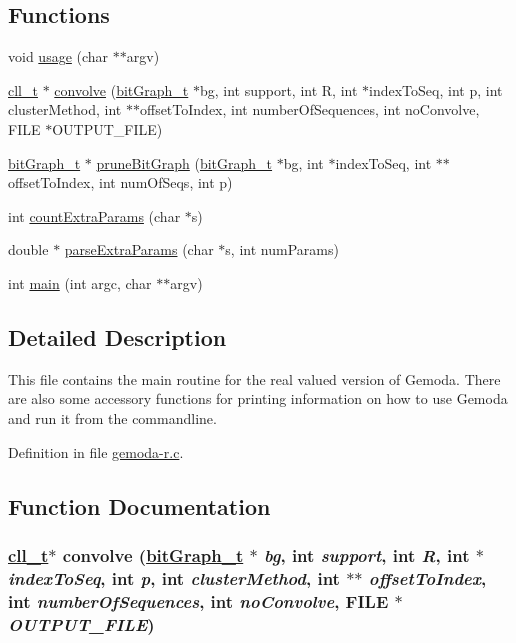 \subsection*{Functions}
\begin{CompactItemize}
\item 
void \hyperlink{gemoda-r_8c_a0}{usage} (char $\ast$$\ast$argv)
\item 
\hyperlink{structcnode}{cll\_\-t} $\ast$ \hyperlink{gemoda-r_8c_a1}{convolve} (\hyperlink{structbitGraph__t}{bit\-Graph\_\-t} $\ast$bg, int support, int R, int $\ast$index\-To\-Seq, int p, int cluster\-Method, int $\ast$$\ast$offset\-To\-Index, int number\-Of\-Sequences, int no\-Convolve, FILE $\ast$OUTPUT\_\-FILE)
\item 
\hyperlink{structbitGraph__t}{bit\-Graph\_\-t} $\ast$ \hyperlink{gemoda-r_8c_a2}{prune\-Bit\-Graph} (\hyperlink{structbitGraph__t}{bit\-Graph\_\-t} $\ast$bg, int $\ast$index\-To\-Seq, int $\ast$$\ast$offset\-To\-Index, int num\-Of\-Seqs, int p)
\item 
int \hyperlink{gemoda-r_8c_a3}{count\-Extra\-Params} (char $\ast$s)
\item 
double $\ast$ \hyperlink{gemoda-r_8c_a4}{parse\-Extra\-Params} (char $\ast$s, int num\-Params)
\item 
int \hyperlink{gemoda-r_8c_a5}{main} (int argc, char $\ast$$\ast$argv)
\end{CompactItemize}


\subsection*{Detailed Description}
This file contains the main routine for the real valued version of Gemoda. There are also some accessory functions for printing information on how to use Gemoda and run it from the commandline.

Definition in file \hyperlink{gemoda-r_8c-source}{gemoda-r.c}.

\subsection*{Function Documentation}
\hypertarget{gemoda-r_8c_a1}{
\subsubsection[convolve]{\setlength{\rightskip}{0pt plus 5cm}\hyperlink{structcnode}{cll\_\-t}$\ast$ convolve (\hyperlink{structbitGraph__t}{bit\-Graph\_\-t} $\ast$ {\em bg}, int {\em support}, int {\em R}, int $\ast$ {\em index\-To\-Seq}, int {\em p}, int {\em cluster\-Method}, int $\ast$$\ast$ {\em offset\-To\-Index}, int {\em number\-Of\-Sequences}, int {\em no\-Convolve}, FILE $\ast$ {\em OUTPUT\_\-FILE})}}
\label{gemoda-r_8c_a1}


